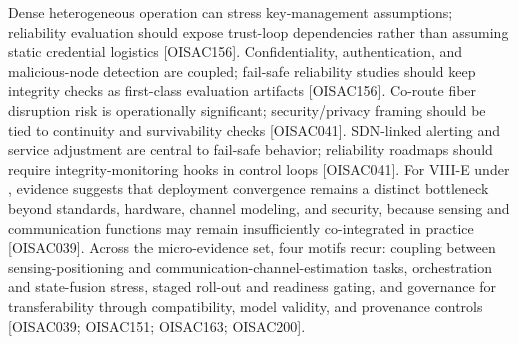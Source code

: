 {}
\markdownRendererSectionEnd \markdownRendererSectionBegin
{}\markdownRendererInterblockSeparator
{}\markdownRendererUlBeginTight
\markdownRendererUlItem Dense heterogeneous operation can stress key-management assumptions; reliability evaluation should expose trust-loop dependencies rather than assuming static credential logistics [O\markdownRendererUnderscore{}ISAC\markdownRendererUnderscore{}156].\markdownRendererUlItemEnd 
\markdownRendererUlItem Confidentiality, authentication, and malicious-node detection are coupled; fail-safe reliability studies should keep integrity checks as first-class evaluation artifacts [O\markdownRendererUnderscore{}ISAC\markdownRendererUnderscore{}156].\markdownRendererUlItemEnd 
\markdownRendererUlItem Co-route fiber disruption risk is operationally significant; security/privacy framing should be tied to continuity and survivability checks [O\markdownRendererUnderscore{}ISAC\markdownRendererUnderscore{}041].\markdownRendererUlItemEnd 
\markdownRendererUlItem SDN-linked alerting and service adjustment are central to fail-safe behavior; reliability roadmaps should require integrity-monitoring hooks in control loops [O\markdownRendererUnderscore{}ISAC\markdownRendererUnderscore{}041].\markdownRendererUlItemEnd 
\markdownRendererUlEndTight \markdownRendererInterblockSeparator
{}
\markdownRendererSectionEnd 
\markdownRendererSectionEnd \markdownRendererSectionBegin
{}\markdownRendererInterblockSeparator
{}\markdownRendererSectionBegin
{}\markdownRendererInterblockSeparator
{}For VIII-E under , evidence suggests that deployment convergence remains a distinct bottleneck beyond standards, hardware, channel modeling, and security, because sensing and communication functions may remain insufficiently co-integrated in practice [O\markdownRendererUnderscore{}ISAC\markdownRendererUnderscore{}039]. Across the micro-evidence set, four motifs recur: coupling between sensing-positioning and communication-channel-estimation tasks, orchestration and state-fusion stress, staged roll-out and readiness gating, and governance for transferability through compatibility, model validity, and provenance controls [O\markdownRendererUnderscore{}ISAC\markdownRendererUnderscore{}039; O\markdownRendererUnderscore{}ISAC\markdownRendererUnderscore{}151; O\markdownRendererUnderscore{}ISAC\markdownRendererUnderscore{}163; O\markdownRendererUnderscore{}ISAC\markdownRendererUnderscore{}200].\markdownRendererInterblockSeparator
